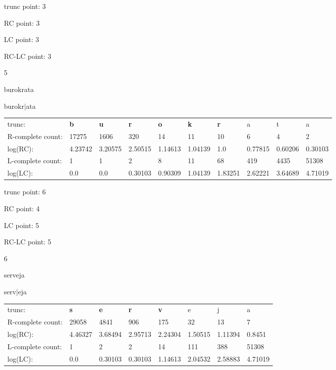 \documentclass{article}
\begin{document}
trunc point: 3

RC point: 3

LC point: 3

RC-LC point: 3

\vspace{3em}



5

burokrata

burokr$|$ata

\vspace{1em}

\begin{tabular}{l|lllllllll}

trunc: & {\color{red}\bf b} & {\color{red}\bf u} & {\color{red}\bf r} & {\color{red}\bf o} & {\color{red}\bf k} & {\color{red}\bf r} & a & t & a \\ 
R-complete count: & 17275 & 1606 & 320 & 14 & 11 & 10 & 6 & 4 & 2 \\ 
log(RC): & 4.23742 & 3.20575 & 2.50515 & 1.14613 & 1.04139 & 1.0 & 0.77815 & 0.60206 & 0.30103 \\ 
L-complete count: & 1 & 1 & 2 & 8 & 11 & 68 & 419 & 4435 & 51308 \\ 
log(LC): & 0.0 & 0.0 & 0.30103 & 0.90309 & 1.04139 & 1.83251 & 2.62221 & 3.64689 & 4.71019 \\ 
\end{tabular}

trunc point: 6

RC point: 4

LC point: 5

RC-LC point: 5

\vspace{3em}



6

serveja

serv$|$eja

\vspace{1em}

\begin{tabular}{l|lllllll}

trunc: & {\color{red}\bf s} & {\color{red}\bf e} & {\color{red}\bf r} & {\color{red}\bf v} & e & j & a \\ 
R-complete count: & 29058 & 4841 & 906 & 175 & 32 & 13 & 7 \\ 
log(RC): & 4.46327 & 3.68494 & 2.95713 & 2.24304 & 1.50515 & 1.11394 & 0.8451 \\ 
L-complete count: & 1 & 2 & 2 & 14 & 111 & 388 & 51308 \\ 
log(LC): & 0.0 & 0.30103 & 0.30103 & 1.14613 & 2.04532 & 2.58883 & 4.71019 \\ 
\end{tabular}
\end{document}
